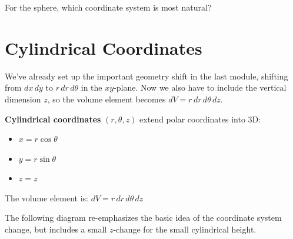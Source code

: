 \documentclass{ximera}
\begin{document}
\begin{problem}
For the sphere, which coordinate system is most natural?
\begin{multipleChoice}
\end{multipleChoice}

\end{problem}

\section*{Cylindrical Coordinates}

We've already set up the important geometry shift in the last module, shifting from $dx\,dy$ to $r\,dr\,d\theta$ in the $xy$-plane. Now we also have to include the vertical dimension $z$, so the volume element becomes $dV = r\,dr\,d\theta\,dz$.

\begin{definition}
\textbf{Cylindrical coordinates} $(r, \theta, z)$ extend polar coordinates into 3D:
\begin{itemize}
    \item $x = r\cos\theta$
    \item $y = r\sin\theta$
    \item $z = z$
\end{itemize}

The volume element is: $dV = r\,dr\,d\theta\,dz$
\end{definition}

The following diagram re-emphasizes the basic idea of the coordinate system change, but includes a small $z$-change for the small cylindrical height.
\end{document}
